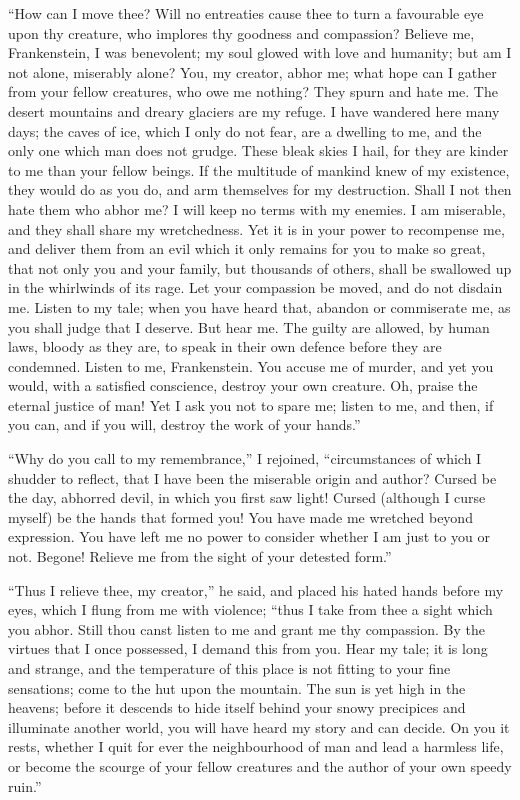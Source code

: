 \documentclass[12pt,openright]{book}
\begin{document}
“How can I move thee? Will no entreaties cause thee to turn a favourable eye upon thy creature, who implores thy goodness and compassion? Believe me, Frankenstein, I was benevolent; my soul glowed with love and humanity; but am I not alone, miserably alone? You, my creator, abhor me; what hope can I gather from your fellow creatures, who owe me nothing? They spurn and hate me. The desert mountains and dreary glaciers are my refuge. I have wandered here many days; the caves of ice, which I only do not fear, are a dwelling to me, and the only one which man does not grudge. These bleak skies I hail, for they are kinder to me than your fellow beings. If the multitude of mankind knew of my existence, they would do as you do, and arm themselves for my destruction. Shall I not then hate them who abhor me? I will keep no terms with my enemies. I am miserable, and they shall share my wretchedness. Yet it is in your power to recompense me, and deliver them from an evil which it only remains for you to make so great, that not only you and your family, but thousands of others, shall be swallowed up in the whirlwinds of its rage. Let your compassion be moved, and do not disdain me. Listen to my tale; when you have heard that, abandon or commiserate me, as you shall judge that I deserve. But hear me. The guilty are allowed, by human laws, bloody as they are, to speak in their own defence before they are condemned. Listen to me, Frankenstein. You accuse me of murder, and yet you would, with a satisfied conscience, destroy your own creature. Oh, praise the eternal justice of man! Yet I ask you not to spare me; listen to me, and then, if you can, and if you will, destroy the work of your hands.”

“Why do you call to my remembrance,” I rejoined, “circumstances of which I shudder to reflect, that I have been the miserable origin and author? Cursed be the day, abhorred devil, in which you first saw light! Cursed (although I curse myself) be the hands that formed you! You have made me wretched beyond expression. You have left me no power to consider whether I am just to you or not. Begone! Relieve me from the sight of your detested form.”

“Thus I relieve thee, my creator,” he said, and placed his hated hands before my eyes, which I flung from me with violence; “thus I take from thee a sight which you abhor. Still thou canst listen to me and grant me thy compassion. By the virtues that I once possessed, I demand this from you. Hear my tale; it is long and strange, and the temperature of this place is not fitting to your fine sensations; come to the hut upon the mountain. The sun is yet high in the heavens; before it descends to hide itself behind your snowy precipices and illuminate another world, you will have heard my story and can decide. On you it rests, whether I quit for ever the neighbourhood of man and lead a harmless life, or become the scourge of your fellow creatures and the author of your own speedy ruin.”
\end{document}
